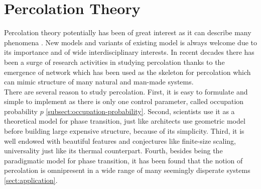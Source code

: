 \chapter{Percolation Theory}

\ifpdf
    \graphicspath{{Chapter4/Figs/}{Chapter4/Figs/playground/}{Chapter4/Figs/entropy_cluster/}}
\else
    \graphicspath{{Chapter4/Figs/}{Chapter4/Figs/playground/}{Chapter4/Figs/entropy_cluster/}}
\fi

Percolation theory potentially has been of great interest as it can describe many phenomena \cite{Sahini1994}. New models and variants of existing model is always welcome due to its importance and of wide interdisciplinary interests. In recent decades there has been a surge of research activities in studying percolation thanks to the emergence of network which has been used as the skeleton for percolation which can mimic structure of many natural and man-made systems.\\

There are several reason to study percolation. First, it is easy to formulate and simple to implement as there is only one control parameter, called occupation probability $p$ \ref{subsect:occupation-probability}. Second, scientists use it as a theoretical model for phase transition, just like architects use geometric model before building large expensive structure, because of its simplicity. Third, it is well endowed with beautiful features and conjectures like finite-size scaling, universality just like its thermal counterpart. Fourth, besides being the paradigmatic model for phase transition, it has been found that the notion of percolation is omnipresent in a wide range of many seemingly disperate systems \ref{sect:application}.\\

